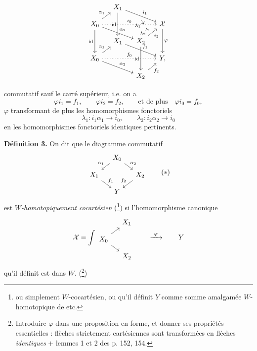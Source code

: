 \[
\begin{tikzcd}[row sep=small, column sep=small]
 & X_1 \arrow[dd, "\mathrm{id}"'] \arrow[rrd, "i_1", ""'{name=I1}] & & \\
X_0 \arrow[ru, "\alpha_1"] \arrow[rrr, dotted, "i_0", ""'{name=I0, pos=0.8}] \arrow[rrd, "\alpha_2"] \arrow[dd, "\mathrm{id}"'] & & & \sX \arrow[dd, "\varphi"] \\
 & X_1 \arrow[rrd, "f_1"] & X_2 \arrow[ru, "i_2"', ""{name=I2}] \arrow[dd, "\mathrm{id}"'] & \\
X_0 \arrow[ru, "\alpha_1"] \arrow[rrr, dotted, "f_0"] \arrow[rrd, "\alpha_2"] & & & Y, \\
 & & X_2 \arrow[ru, "f_2"'] &
\arrow[from=I1, to=I0, "\lambda_1"', shorten <=1pt, shorten >=1pt]
\arrow[from=I2, to=I0, bend left, "\lambda_2", shorten <=1pt, shorten >=1pt] %
\end{tikzcd}
\]

commutatif sauf le carré supérieur, i.e. on a
\[
\varphi i_1 = f_1, \qquad \varphi i_2 = f_2, \qquad \text{et de plus} \quad \varphi i_0 = f_0,
\]
$\varphi$ transformant de plus les homomorphismes fonctoriels
\[
\lambda_1 : i_1\alpha_1 \longrightarrow i_0, \qquad \lambda_2 : i_2\alpha_2 \longrightarrow i_0
\]
en les homomorphismes fonctoriels identiques pertinents.

\setcounter{footnote}{85}
\textbf{Définition 3.} On dit que le diagramme commutatif
\[
\begin{tikzcd}[row sep=small, column sep=small]
 & X_0 \arrow[dl, "\alpha_1"'] \arrow[dr, "\alpha_2"] & \\
X_1 \arrow[dr, "f_1"] & & X_2 \arrow[dl, "f_2"'] \\
 & Y &
\end{tikzcd}
\tag*{$(*)$}
\]
est \textit{$W$-homotopiquement cocartésien} (\footnote{ou simplement $W$-cocartésien, ou qu'il définit $Y$ comme somme amalgamée $W$-homotopique de etc.}) si l'homomorphisme canonique
\[
\sX = \int
\begin{tikzcd}[row sep=small, column sep=small]
 & X_1 \\
X_0 \arrow[ur] \arrow[dr] & \\
 & X_2
\end{tikzcd}
\qquad \xrightarrow{\ \varphi\ } \qquad Y
\]
qu'il définit est dans $W$. (\footnote{Introduire $\varphi$ dans une proposition en forme, et donner ses propriétés essentielles : flèches strictement cartésiennes sont transformées en flèches \textit{identiques} $+$ lemmes 1 et 2 des p. 152, 154.})

